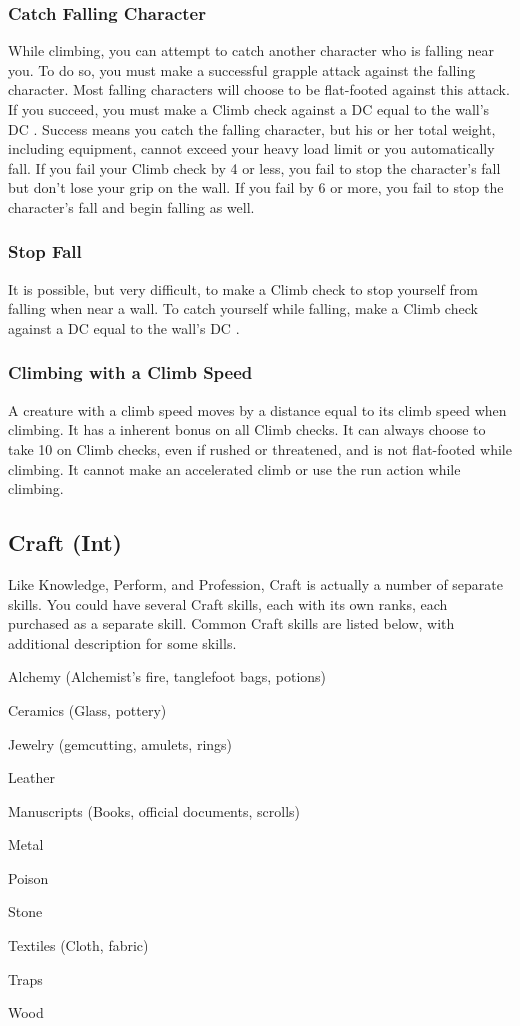 \subsubsection{Catch Falling Character}
While climbing, you can attempt to catch another character who is falling near you. To do so, you must make a successful grapple attack against the falling character. Most falling characters will choose to be flat-footed against this attack. If you succeed, you must make a Climb check against a DC equal to the wall's DC . Success means you catch the falling character, but his or her total weight, including equipment, cannot exceed your heavy load limit or you automatically fall. If you fail your Climb check by 4 or less, you fail to stop the character's fall but don't lose your grip on the wall. If you fail by 6 or more, you fail to stop the character's fall and begin falling as well.

\subsubsection{Stop Fall}
It is possible, but very difficult, to make a Climb check to stop yourself from falling when near a wall. To catch yourself while falling, make a Climb check against a DC equal to the wall's DC .

\subsubsection{Climbing with a Climb Speed}
A creature with a climb speed moves by a distance equal to its climb speed when climbing. It has a  inherent bonus on all Climb checks. It can always choose to take 10 on Climb checks, even if rushed or threatened, and is not flat-footed while climbing. It cannot make an accelerated climb or use the run action while climbing.

\subsection{Craft (Int)}
Like Knowledge, Perform, and Profession, Craft is actually a number of separate skills. You could have several Craft skills, each with its own ranks, each purchased as a separate skill. Common Craft skills are listed below, with additional description for some skills.

\begin{itemize*}
  \item Alchemy (Alchemist's fire, tanglefoot bags, potions)
  \item Ceramics (Glass, pottery)
  \item Jewelry (gemcutting, amulets, rings)
  \item Leather
  \item Manuscripts (Books, official documents, scrolls)
  \item Metal
  \item Poison
  \item Stone
  \item Textiles (Cloth, fabric)
  \item Traps
  \item Wood
\end{itemize*}

